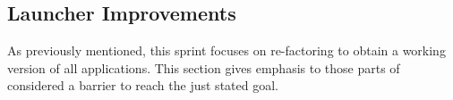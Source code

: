 \subsection{Launcher Improvements}
As previously mentioned, this sprint focuses on re-factoring \launcher to obtain a working version of all \giraf applications.
This section gives emphasis to those parts of \launcher considered a barrier to reach the just stated goal.